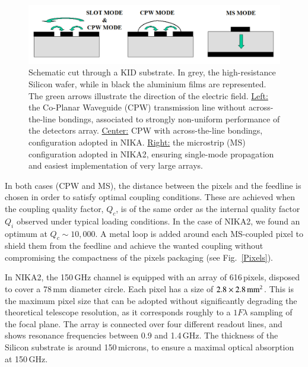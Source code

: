 \documentclass[]{aa} %
\begin{document}
\begin{figure}[h]
   \centering
    \includegraphics[width=.95\linewidth]{CPWvsMS.png}
      \caption{Schematic cut through a KID substrate. In grey, the high-resistance Silicon wafer, while in black the aluminium films are represented. The green arrows illustrate the direction of the electric field. \underline{Left:} the Co-Planar Waveguide (CPW) transmission line without across-the-line bondings, associated to strongly non-uniform performance of the detectors array. \underline{Center:} CPW with across-the-line bondings, configuration adopted in NIKA. \underline{Right:} the microstrip (MS) configuration adopted in NIKA2, ensuring single-mode propagation and easiest implementation of very large arrays.}
         \label{CPWvsMS}
\end{figure}

In both cases (CPW and MS), the distance between the pixels and the feedline is chosen in order to satisfy optimal coupling conditions. These are achieved when the coupling quality factor, $Q_c$, is of the same order as the internal quality factor $Q_i$ observed under typical loading conditions. In the case of NIKA2, we found an optimum at $Q_c\sim10,000$. A metal loop is added around each MS-coupled pixel to shield them from the feedline and achieve the wanted coupling without compromising the compactness of the pixels packaging (see Fig.~\ref{Pixels}). 

In NIKA2, the 150\,GHz channel is equipped with an array of 616\,pixels, disposed to cover a 78\,mm diameter circle. Each pixel has a size of $2.8\times2.8\textrm{\,mm}^2$. This is the maximum pixel size that can be adopted without significantly degrading the theoretical telescope resolution, as it corresponds roughly to a $1 F \lambda$ sampling of the focal plane. The array is connected over four different readout lines, and shows resonance frequencies between 0.9 and 1.4\,GHz. The thickness of the Silicon substrate is around 150\,microns, to ensure a maximal optical absorption at 150\,GHz. 
\end{document}

